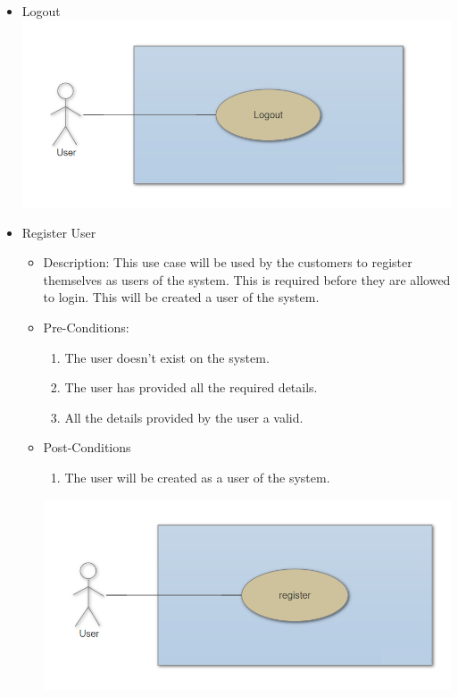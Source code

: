 \documentclass[a4paper,10pt]{article}
\begin{document}
\begin{enumerate}
\begin{itemize}
				\item Logout\\
				\includegraphics[scale=0.5]{Diagrams/logout.png}\\
				
				\item{Register User}
					\begin{itemize}
						\item Description:
					This use case will be used by the customers to register themselves as users of the system. This is required before they are allowed to login. 
					This will be created a user of the system.

						\item Pre-Conditions:
						\begin{enumerate}
							\item The user doesn't exist on the system.
							\item The user has provided all the required details.
							\item All the details provided by the user a valid. 
						\end{enumerate}
						\item Post-Conditions
						\begin{enumerate}
							\item The user will be created as a user of the system.
						\end{enumerate}
		 \includegraphics[scale=0.62]{Diagrams/RegisterUseCase.png}\\
					\end{itemize}



\end{itemize}
\end{enumerate}
\end{document}
